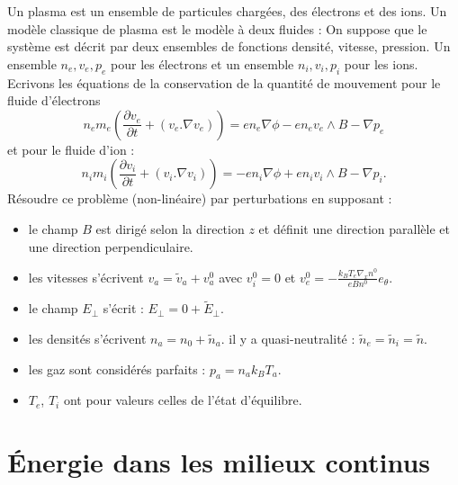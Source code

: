 \documentclass[12pt]{book}
\begin{document}
\begin{exo}\label{exoplasmapert}
Un plasma est un ensemble de particules charg\'ees, des \'electrons et des
ions. Un mod\`ele classique de plasma est le mod\`ele \`a deux fluides :
On suppose que le syst\`eme est d\'ecrit par deux ensembles de fonctions
densit\'e, vitesse, pression. Un ensemble $n_e, v_e, p_e$ pour les \'electrons
et un ensemble $n_i, v_i, p_i$ 
pour les ions.
Ecrivons les \'equations de la conservation 
de la quantit\'e de mouvement pour le fluide d'\'electrons 
\begin{equation}\label{me}
n_e m_e(\frac{\partial v_e}{\partial t}+({v}_e.\nabla
v_e))=en_e\nabla \phi - e n_e v_e \wedge B -\nabla p_e
\end{equation}
et pour le fluide d'ion :
\begin{equation}\label{mi}
n_i m_i(\frac{\partial v_i}{\partial t}+({v}_i.\nabla v_i))=-en_i\nabla \phi + en_i v_i \wedge B -\nabla p_i.
\end{equation}
R\'esoudre ce probl\`eme (non-lin\'eaire) par perturbations
en supposant :

\begin{itemize}
\item le champ $B$ est dirig\'e selon la direction $z$ et d\'efinit une
  direction parall\`ele et une direction perpendiculaire.
\item les vitesses s'\'ecrivent $v_a=\tilde{v}_a+v_a^0$
avec $v_i^0=0$ et $v_e^0=-\frac{k_B T_e \nabla_x n^0}{e B n^0} e_{\theta}$.
\item le champ $E_\perp$ s'\'ecrit : $E_\perp=0+\tilde{E}_\perp$.
\item les densit\'es s'\'ecrivent $n_a=n_0+\tilde{n}_a$. 
 il y a quasi-neutralit\'e : $\tilde{n}_e=\tilde{n}_i=\tilde{n}$.
\item les gaz sont consid\'er\'es 
parfaits : $p_a=n_ak_BT_a$.
\item $T_e$, $T_i$ ont pour valeurs celles de l'\'etat d'\'equilibre.
\end{itemize}

\end{exo}

\chapter{\'Energie dans les milieux continus}\label{chapenermilcon}\label{parenergint}
\end{document}
